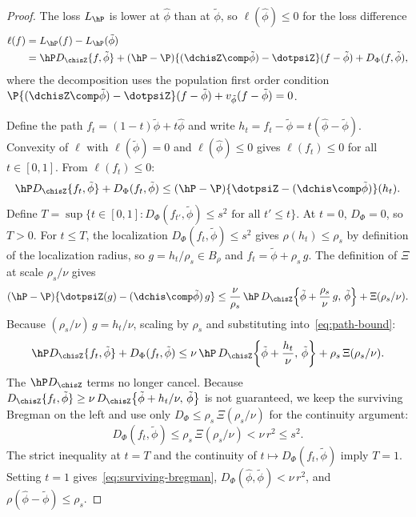 \documentclass{article}
\begin{document}
\begin{proof}
The loss $L_{\hP}$ is lower at $\hat\phi$ than at $\tilde\phi$, so $\ell(\hat\phi) \le 0$ for the loss difference
\begin{equation}
\label{eq:rate-loss-diff}
\begin{aligned}
\ell(f) &= L_{\hP}(f) - L_{\hP}(\tilde\phi) \\
&= \hP D_{\chisZ}\{f, \tilde\phi\} + (\hP - \P)\{(\dchisZ \comp \tilde\phi) - \dotpsiZ\}(f - \tilde\phi) + D_\Phi(f, \tilde\phi),
\end{aligned}
\end{equation}
where the decomposition uses the population first order condition $\P\{(\dchisZ \comp \tilde\phi) - \dotpsiZ\}(f - \tilde\phi) + v_{\tilde\phi}(f - \tilde\phi) = 0$.

Define the path $f_t = (1-t)\tilde\phi + t\hat\phi$ and write $h_t = f_t - \tilde\phi = t(\hat\phi - \tilde\phi)$. Convexity of $\ell$ with $\ell(\tilde\phi) = 0$ and $\ell(\hat\phi) \le 0$ gives $\ell(f_t) \le 0$ for all $t \in [0,1]$. From $\ell(f_t) \le 0$:
\begin{equation}\label{eq:path-bound}
\hP D_{\chisZ}\{f_t, \tilde\phi\} + D_\Phi(f_t, \tilde\phi) \le (\hP - \P)\{\dotpsiZ - (\dchis \comp \tilde\phi)\}(h_t).
\end{equation}
Define $T = \sup\{t \in [0,1] : D_\Phi(f_{t'}, \tilde\phi) \le s^2 \text{ for all } t' \le t\}$. At $t=0$, $D_\Phi = 0$, so $T > 0$. For $t \le T$, the localization $D_\Phi(f_t, \tilde\phi) \le s^2$ gives $\rho(h_t) \le \rho_s$ by definition of the localization radius, so $g = h_t/\rho_s \in B_\rho$ and $f_t = \tilde\phi + \rho_s\, g$. The definition of $\Xi$ at scale $\rho_s/\nu$ gives
\[
(\hP - \P)\{\dotpsiZ(g) - (\dchis \comp \tilde\phi)\, g\}
  \le \frac{\nu}{\rho_s}\, \hP\, D_{\chisZ}\!\left\{\tilde\phi + \frac{\rho_s}{\nu}\, g,\, \tilde\phi\right\}
    + \Xi(\rho_s/\nu).
\]
Because $(\rho_s/\nu)\,g = h_t/\nu$, scaling by $\rho_s$ and substituting into~\eqref{eq:path-bound}:
\[
\hP D_{\chisZ}\{f_t, \tilde\phi\} + D_\Phi(f_t, \tilde\phi)
  \le \nu\, \hP\, D_{\chisZ}\!\left\{\tilde\phi + \frac{h_t}{\nu},\, \tilde\phi\right\}
    + \rho_s\, \Xi(\rho_s/\nu).
\]
The $\hP D_{\chisZ}$ terms no longer cancel.
Because $D_{\chisZ}\{f_t, \tilde\phi\}
  \ge \nu\, D_{\chisZ}\!\left\{\tilde\phi + h_t/\nu,\, \tilde\phi\right\}$
is not guaranteed,
we keep the surviving Bregman
on the left and use only $D_\Phi \le \rho_s\,\Xi(\rho_s/\nu)$
for the continuity argument:
\[
D_\Phi(f_t, \tilde\phi)
  \le \rho_s\, \Xi(\rho_s/\nu) < \nu\, r^2 \le s^2.
\]
The strict inequality at $t = T$ and the continuity of $t \mapsto D_\Phi(f_t, \tilde\phi)$ imply $T = 1$. Setting $t = 1$ gives~\eqref{eq:surviving-bregman}, $D_\Phi(\hat\phi, \tilde\phi) < \nu\, r^2$, and $\rho(\hat\phi - \tilde\phi) \le \rho_s$.
\end{proof}
\end{document}
